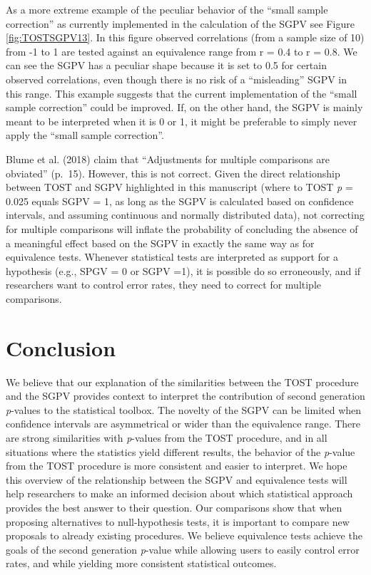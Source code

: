 \documentclass[,man,floatsintext]{apa6}
\begin{document}
As a more extreme example of the peculiar behavior of the \enquote{small
sample correction} as currently implemented in the calculation of the
SGPV see Figure \ref{fig:TOSTSGPV13}. In this figure observed
correlations (from a sample size of 10) from -1 to 1 are tested against
an equivalence range from r = 0.4 to r = 0.8. We can see the SGPV has a
peculiar shape because it is set to 0.5 for certain observed
correlations, even though there is no risk of a \enquote{misleading}
SGPV in this range. This example suggests that the current
implementation of the \enquote{small sample correction} could be
improved. If, on the other hand, the SGPV is mainly meant to be
interpreted when it is 0 or 1, it might be preferable to simply never
apply the \enquote{small sample correction}.

Blume et al. (2018) claim that \enquote{Adjustments for multiple
comparisons are obviated} (p.~15). However, this is not correct. Given
the direct relationship between TOST and SGPV highlighted in this
manuscript (where to TOST \emph{p} = 0.025 equals SGPV = 1, as long as
the SGPV is calculated based on confidence intervals, and assuming
continuous and normally distributed data), not correcting for multiple
comparisons will inflate the probability of concluding the absence of a
meaningful effect based on the SGPV in exactly the same way as for
equivalence tests. Whenever statistical tests are interpreted as support
for a hypothesis (e.g., SPGV = 0 or SGPV =1), it is possible do so
erroneously, and if researchers want to control error rates, they need
to correct for multiple comparisons.

\section{Conclusion}\label{conclusion}

We believe that our explanation of the similarities between the TOST
procedure and the SGPV provides context to interpret the contribution of
second generation \emph{p}-values to the statistical toolbox. The
novelty of the SGPV can be limited when confidence intervals are
asymmetrical or wider than the equivalence range. There are strong
similarities with \emph{p}-values from the TOST procedure, and in all
situations where the statistics yield different results, the behavior of
the \emph{p}-value from the TOST procedure is more consistent and easier
to interpret. We hope this overview of the relationship between the SGPV
and equivalence tests will help researchers to make an informed decision
about which statistical approach provides the best answer to their
question. Our comparisons show that when proposing alternatives to
null-hypothesis tests, it is important to compare new proposals to
already existing procedures. We believe equivalence tests achieve the
goals of the second generation \emph{p}-value while allowing users to
easily control error rates, and while yielding more consistent
statistical outcomes.
\end{document}
